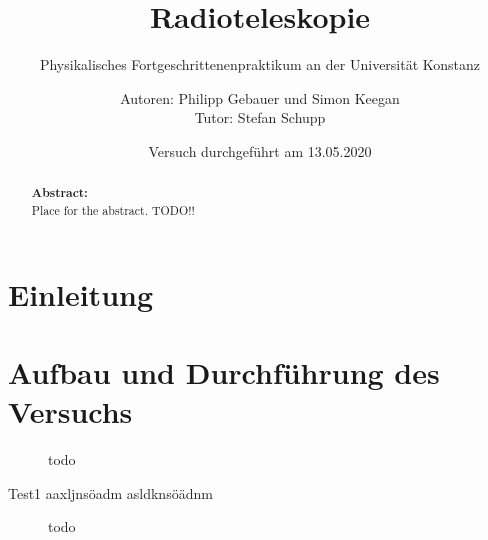 

 
 \title{Radioteleskopie}
 \subtitle{Physikalisches Fortgeschrittenenpraktikum an der Universität Konstanz}
 \author{Autoren: Philipp Gebauer und Simon Keegan \\ \large{Tutor: Stefan Schupp}}
 \date{Versuch durchgeführt am 13.05.2020}
 \maketitle
 \vspace{2.5 cm}
 \begin{abstract}
     \noindent \textbf{Abstract:}\\
     Place for the abstract. TODO!!
     \vspace{1cm}
     
     \end{abstract}
 \thispagestyle{empty}
 \newpage
 
 \tableofcontents
 \thispagestyle{empty}
 \newpage
 \setcounter{page}{1}    
 
\section{Einleitung}
\section{Aufbau und Durchführung des Versuchs}
\begin{figure}[H]
    \centering
    
    \caption{todo}
    \label{fig:Sonnenabbild}
\end{figure}
Test1
 aaxljnsöadm
     asldknsöädnm
\begin{figure}[H]
    \centering
    
    \caption{todo}
    \label{fig:Sonnenkreuz_Az}
\end{figure}

